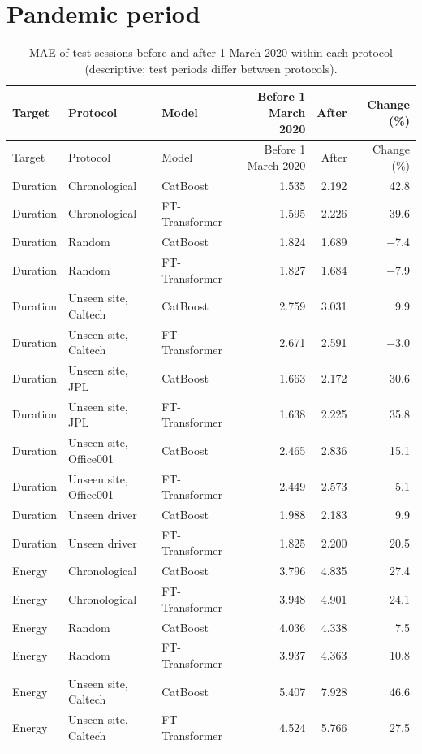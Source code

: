 \section{Pandemic period}
{\footnotesize\begin{longtable}{lllrrr}
\caption{MAE of test sessions before and after 1 March 2020 within each protocol (descriptive; test periods differ between protocols).}\label{tab:s-pandemic}\\
\toprule
Target & Protocol & Model & Before 1 March 2020 & After & Change (\%) \\
\midrule
\endfirsthead
\toprule
Target & Protocol & Model & Before 1 March 2020 & After & Change (\%) \\
\midrule
\endhead
\bottomrule
\endfoot
Duration & Chronological & CatBoost & 1.535 & 2.192 & 42.8 \\
Duration & Chronological & FT-Transformer & 1.595 & 2.226 & 39.6 \\
Duration & Random & CatBoost & 1.824 & 1.689 & $-$7.4 \\
Duration & Random & FT-Transformer & 1.827 & 1.684 & $-$7.9 \\
Duration & Unseen site, Caltech & CatBoost & 2.759 & 3.031 & 9.9 \\
Duration & Unseen site, Caltech & FT-Transformer & 2.671 & 2.591 & $-$3.0 \\
Duration & Unseen site, JPL & CatBoost & 1.663 & 2.172 & 30.6 \\
Duration & Unseen site, JPL & FT-Transformer & 1.638 & 2.225 & 35.8 \\
Duration & Unseen site, Office001 & CatBoost & 2.465 & 2.836 & 15.1 \\
Duration & Unseen site, Office001 & FT-Transformer & 2.449 & 2.573 & 5.1 \\
Duration & Unseen driver & CatBoost & 1.988 & 2.183 & 9.9 \\
Duration & Unseen driver & FT-Transformer & 1.825 & 2.200 & 20.5 \\
Energy & Chronological & CatBoost & 3.796 & 4.835 & 27.4 \\
Energy & Chronological & FT-Transformer & 3.948 & 4.901 & 24.1 \\
Energy & Random & CatBoost & 4.036 & 4.338 & 7.5 \\
Energy & Random & FT-Transformer & 3.937 & 4.363 & 10.8 \\
Energy & Unseen site, Caltech & CatBoost & 5.407 & 7.928 & 46.6 \\
Energy & Unseen site, Caltech & FT-Transformer & 4.524 & 5.766 & 27.5 \\

\end{longtable}}
